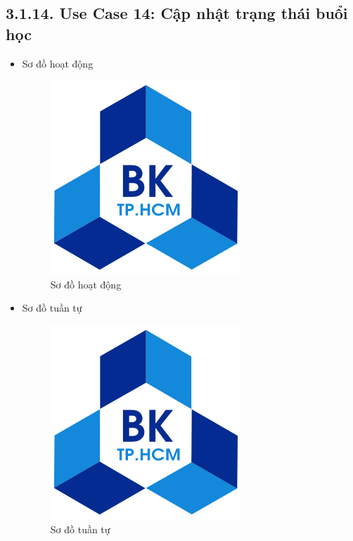 \subsection*{3.1.14. Use Case 14: Cập nhật trạng thái buổi học}
\begin{itemize}
    \item Sơ đồ hoạt động
    \begin{figure}[H]
    \centering
    \includegraphics[scale=0.5 ]{Picture/hcmut.png}
    \caption{Sơ đồ hoạt động }
    \end{figure}
    \item Sơ đồ tuần tự
    \begin{figure}[H]
    \centering
    \includegraphics[scale=0.5 ]{Picture/hcmut.png}
    \caption{Sơ đồ tuần tự }
    \end{figure}
\end{itemize}
